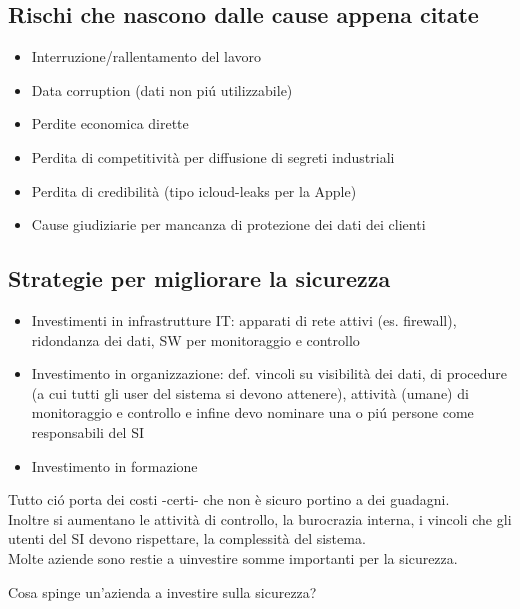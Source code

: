 \subsection{Rischi che nascono dalle cause appena citate}

\begin{itemize}

\item
  Interruzione/rallentamento del lavoro
\item
  Data corruption (dati non pi\'u utilizzabile)
\item
  Perdite economica dirette
\item
  Perdita di competitivit\`a per diffusione di segreti industriali
\item
  Perdita di credibilit\`a (tipo icloud-leaks per la Apple)
\item
  Cause giudiziarie per mancanza di protezione dei dati dei clienti
\end{itemize}

\subsection{Strategie per migliorare la
sicurezza}

\begin{itemize}

\item
  Investimenti in infrastrutture IT: apparati di rete attivi (es.
  firewall), ridondanza dei dati, SW per monitoraggio e controllo
\item
  Investimento in organizzazione: def. vincoli su visibilit\`a dei dati,
  di procedure (a cui tutti gli user del sistema si devono attenere),
  attivit\`a (umane) di monitoraggio e controllo e infine devo nominare
  una o pi\'u persone come responsabili del SI
\item
  Investimento in formazione
\end{itemize}

Tutto ci\'o porta dei costi -certi- che non \`e sicuro portino a dei
guadagni.\\
Inoltre si aumentano le attivit\`a di controllo, la burocrazia interna, i
vincoli che gli utenti del SI devono rispettare, la complessit\`a del
sistema.\\
Molte aziende sono restie a uinvestire somme importanti per la
sicurezza.

Cosa spinge un'azienda a investire sulla sicurezza?

